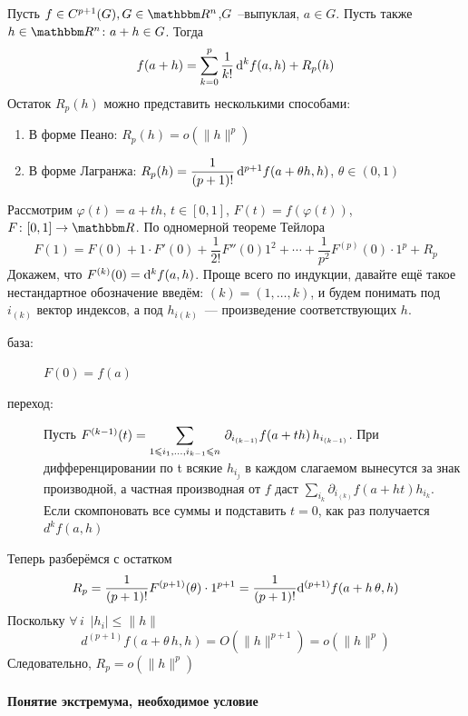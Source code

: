 \documentclass[12pt,timbord]{../../../notes}
\begin{document}
\begin{thrm}\label{thrm:diffspace::taylor}
  Пусть $f \in C^{p+1}(G), G\in \R^n$,$G$~--выпуклая, $a\in G$. 
  Пусть также $h\in \R^n \colon a+h \in G$.
  Тогда 
  \[
    f(a+h) = \sum_{k=0}^p \frac{1}{k!} \, \mathrm{d}^k f(a,h) + R_p(h)
  \]
  Остаток $R_p(h)$ можно представить несколькими способами:
  \begin{enumerate}
    \item В форме Пеано: $R_p(h) = o(\|h\|^p)$
    \item В форме Лагранжа: $R_p(h) = \dfrac{1}{(p+1)!}\, \mathrm{d}^{p+1} f(a + \theta h, h)$, 
      $\theta \in (0,1)$
  \end{enumerate}
\end{thrm}
\begin{ittproof}
  Рассмотрим $\varphi(t) = a + t h$, $t\in [0,1]$, $F(t) = f(\varphi(t))$, $F\colon [0,1]\to \R$.
  По одномерной теореме Тейлора 
  \[
    F(1) = F(0)+ 1\cdot F'(0) + \frac{1}{2!} F''(0) 1^2 + \dotsb + \frac{1}{p^2} F^{(p)}(0) \cdot
    1^p + R_p
  \]
  Докажем, что $F^{(k)}(0) = \mathrm{d} ^k f(a,h)$.
  Проще всего по индукции, давайте ещё такое нестандартное обозначение введём: 
  $(k) = (1, \dotsc, k)$, и будем понимать под $i_{(k)}$ вектор индексов, а под 
  $h_{i{(k)}}$~--- произведение соответствующих $h$.
  \begin{description}
    \item[база:] $F(0) = f(a)$
    \item[переход:] Пусть $F^{(k-1)}(t) = \displaystyle\sum_{1 \leqslant i_1, \dotsc, i_{k-1} \leqslant n } \,
      \partial_{i_{(k-1)}} f(a + th) \, h_{i_{(k-1)}}$. При дифференцировании по t всякие
      $h_{i_j}$ в каждом слагаемом вынесутся за знак производной, а частная производная от $f$
      даст $\sum_{i_k} \partial_{i_{(k)}} f(a+ht) h_{i_k}$. Если скомпоновать все суммы и
      подставить $t=0$, как раз получается $d^k f(a,h)$
  \end{description}

  Теперь разберёмся с остатком
  \[
    R_p = \frac{1}{(p+1)!}F^{(p+1)}(\theta)\cdot1^{p+1}=\frac{1}{(p+1)!}\mathrm{d}^{(p+1)}f(a+h\,\theta, h) 
  \]
  Поскольку $\forall\, i\;\: |h_i| \leqslant \|h\|$
  \[
    d^{(p+1)} f(a+\theta\, h , h) = O(\|h\|^{p+1}) = o(\|h\|^p)
  \]
  Следовательно, $R_p = o(\|h\|^p)$
\end{ittproof}

\paragraph{Понятие экстремума, необходимое условие}
\label{par:diffspace::extrema::ness}
\end{document}
